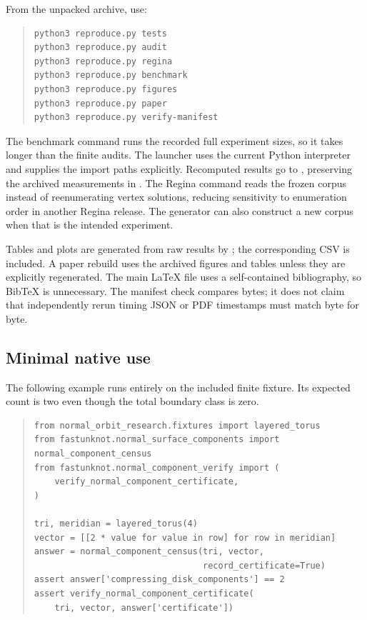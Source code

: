 From the unpacked archive, use:
\begin{quote}\small
\begin{minipage}{\linewidth}
\begin{verbatim}
python3 reproduce.py tests
python3 reproduce.py audit
python3 reproduce.py regina
python3 reproduce.py benchmark
python3 reproduce.py figures
python3 reproduce.py paper
python3 reproduce.py verify-manifest
\end{verbatim}
\end{minipage}
\end{quote}

The benchmark command runs the recorded full experiment sizes, so it takes
longer than the finite audits. The launcher uses the current Python
interpreter and supplies the import paths explicitly. Recomputed results go
to , preserving the archived measurements in
. The Regina command reads the frozen corpus instead of
reenumerating vertex solutions, reducing sensitivity to enumeration order
in another Regina release. The generator can also construct a new corpus
when that is the intended experiment.

Tables and plots are generated from raw results by
; the corresponding CSV is included. A paper
rebuild uses the archived figures and tables unless they are explicitly
regenerated. The main \LaTeX{} file uses a self-contained bibliography, so
BibTeX is unnecessary. The manifest check compares bytes; it does not claim
that independently rerun timing JSON or PDF timestamps must match byte for
byte.

\subsection{Minimal native use}

The following example runs entirely on the included finite fixture. Its
expected count is two even though the total boundary class is zero.
\begin{quote}\small
\begin{minipage}{\linewidth}
\begin{verbatim}
from normal_orbit_research.fixtures import layered_torus
from fastunknot.normal_surface_components import normal_component_census
from fastunknot.normal_component_verify import (
    verify_normal_component_certificate,
)

tri, meridian = layered_torus(4)
vector = [[2 * value for value in row] for row in meridian]
answer = normal_component_census(tri, vector,
                                 record_certificate=True)
assert answer['compressing_disk_components'] == 2
assert verify_normal_component_certificate(
    tri, vector, answer['certificate'])
\end{verbatim}
\end{minipage}
\end{quote}

